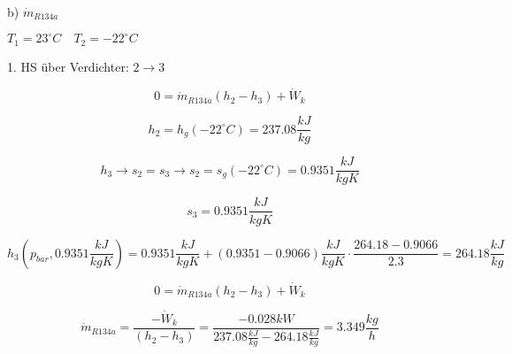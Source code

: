 b) $\dot{m}_{R134a}$

$T_1 = 23^\circ C \quad T_2 = -22^\circ C$

1. HS über Verdichter: $2 \rightarrow 3$

\[
0 = \dot{m}_{R134a} (h_2 - h_3) + \dot{W}_k
\]

\[
h_2 = h_g (-22^\circ C) = 237.08 \frac{kJ}{kg}
\]

\[
h_3 \rightarrow s_2 = s_3 \rightarrow s_2 = s_g (-22^\circ C) = 0.9351 \frac{kJ}{kgK}
\]

\[
s_3 = 0.9351 \frac{kJ}{kgK}
\]

\[
h_3 (p_{bar}, 0.9351 \frac{kJ}{kgK}) = 0.9351 \frac{kJ}{kgK} + (0.9351 - 0.9066) \frac{kJ}{kgK} \cdot \frac{264.18 - 0.9066}{2.3} = 264.18 \frac{kJ}{kg}
\]

\[
0 = \dot{m}_{R134a} (h_2 - h_3) + \dot{W}_k
\]

\[
\dot{m}_{R134a} = \frac{-\dot{W}_k}{(h_2 - h_3)} = \frac{-0.028 kW}{237.08 \frac{kJ}{kg} - 264.18 \frac{kJ}{kg}} = 3.349 \frac{kg}{h}
\]